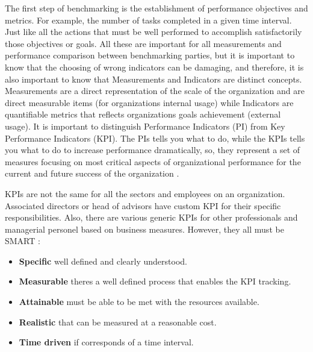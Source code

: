 The first step of benchmarking is the establishment of performance objectives and metrics. For example, the number of tasks completed in a given time interval. Just like all the actions that must be well performed to accomplish satisfactorily those objectives or goals. All these are important for all measurements and performance comparison between benchmarking parties, but it is important to know that the choosing of wrong indicators can be damaging, and therefore, it is also important to know that Measurements and Indicators are distinct concepts. Measurements are a direct representation of the scale of the organization and are direct measurable items (for organizations internal usage) while Indicators are quantifiable metrics that reflects organizations goals achievement (external usage). It is important to distinguish Performance Indicators (PI) from Key Performance Indicators (KPI). The PIs tells you what to do, while the KPIs tells you what to do to increase performance dramatically, so, they represent a set of measures focusing on most critical aspects of organizational performance for the current and future success of the organization \cite{Parmenter2007}.

KPIs are not the same for all the sectors and employees on an organization. Associated directors or head of advisors have custom KPI for their specific responsibilities. Also, there are various generic KPIs for other professionals and managerial personel based on business measures. However, they all must be SMART \cite{Arash2007}:
\begin{itemize} %
	\item {\bf Specific} well defined and clearly understood.
	\item {\bf Measurable} theres a well defined process that enables the KPI tracking.
	\item {\bf Attainable} must be able to be met with the resources available.
	\item {\bf Realistic} that can be measured at a reasonable cost.
	\item {\bf Time driven} if corresponds of a time interval.
\end{itemize}

